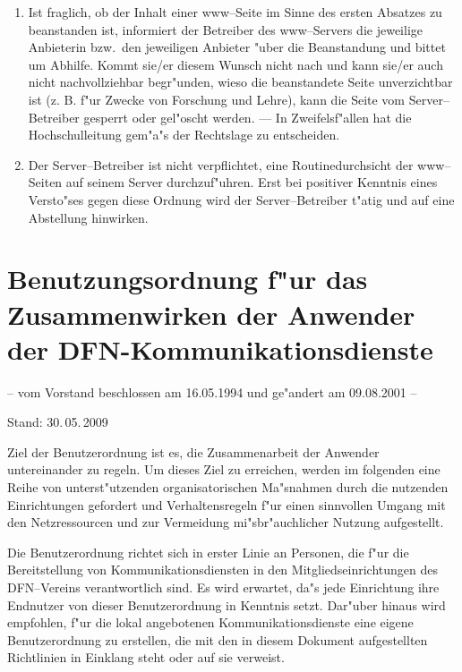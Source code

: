\documentclass[12pt,titlepage,twoside]{scrartcl}
\begin{document}
\begin{appendix}
\begin{enumerate}
  \item Ist fraglich, ob der Inhalt einer www--Seite im Sinne des
        ersten Absatzes zu beanstanden ist, informiert der Betreiber
        des www--Servers die jeweilige Anbieterin bzw.\  den jeweiligen
        Anbieter "uber die Beanstandung und bittet um Abhilfe.
        Kommt sie/er diesem Wunsch nicht nach und kann sie/er auch
        nicht nachvollziehbar begr"unden, wieso die beanstandete
        Seite unverzichtbar ist (z. B. f"ur Zwecke von Forschung
        und Lehre), kann die Seite vom Server--Betreiber gesperrt oder
        gel"oscht werden. --- In Zweifelsf"allen hat die
        Hochschulleitung gem"a"s der Rechtslage zu
        entscheiden.

  \item Der Server--Betreiber ist nicht verpflichtet, eine
        Routinedurchsicht der www--Seiten auf seinem Server
        durchzuf"uhren. Erst bei positiver Kenntnis eines
        Versto"ses gegen diese Ordnung wird der
        Server--Betreiber t"atig und auf eine Abstellung
        hinwirken.
\end{enumerate}

\clearpage

\section[DFN-Benutzungsordnung]{Benutzungsordnung f"ur das Zusammenwirken der Anwender der DFN-Kommunikationsdienste}
\label{dfn}

{\small -- vom Vorstand beschlossen am 16.05.1994 und ge"andert am 09.08.2001 --

Stand: 30.\,05.\,2009}

Ziel der Benutzerordnung ist es, die Zusammenarbeit der Anwender
untereinander zu regeln. Um dieses Ziel zu erreichen, werden im folgenden
eine Reihe von unterst"utzenden organisatorischen Ma"snahmen durch die
nutzenden Einrichtungen gefordert und Verhaltensregeln f"ur einen sinnvollen
Umgang mit den Netzressourcen und zur Vermeidung mi"sbr"auchlicher Nutzung
aufgestellt.

Die Benutzerordnung richtet sich in erster Linie an Personen, die f"ur die
Bereitstellung von Kommunikationsdiensten in den Mitgliedseinrichtungen des
DFN--Vereins verantwortlich sind. Es wird erwartet, da"s jede Einrichtung ihre
Endnutzer von dieser Benutzerordnung in Kenntnis setzt. Dar"uber hinaus wird
empfohlen, f"ur die lokal angebotenen Kommunikationsdienste eine eigene
Benutzerordnung zu erstellen, die mit den in diesem Dokument aufgestellten
Richtlinien in Einklang steht oder auf sie verweist.


\end{appendix}
\end{document}
